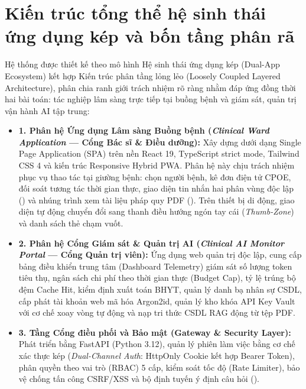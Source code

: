 \section{Kiến trúc tổng thể hệ sinh thái ứng dụng kép và bốn tầng phân rã}
\label{sec:system_architecture}

Hệ thống được thiết kế theo mô hình Hệ sinh thái ứng dụng kép (Dual-App Ecosystem) kết hợp Kiến trúc phân tầng lỏng lẻo (Loosely Coupled Layered Architecture), phân chia ranh giới trách nhiệm rõ ràng nhằm đáp ứng đồng thời hai bài toán: tác nghiệp lâm sàng trực tiếp tại buồng bệnh và giám sát, quản trị vận hành AI tập trung:

\begin{itemize}[leftmargin=1.5em]
    \item \textbf{1. Phân hệ Ứng dụng Lâm sàng Buồng bệnh (\textit{Clinical Ward Application} --- Cổng Bác sĩ \& Điều dưỡng):}
    Xây dựng dưới dạng Single Page Application (SPA) trên nền React 19, TypeScript strict mode, Tailwind CSS 4 và kiến trúc Responsive Hybrid PWA. Phân hệ này chịu trách nhiệm phục vụ thao tác tại giường bệnh: chọn người bệnh, kê đơn điện tử CPOE, đối soát tương tác thời gian thực, giao diện tin nhắn hai phân vùng độc lập () và nhúng trình xem tài liệu pháp quy PDF (). Trên thiết bị di động, giao diện tự động chuyển đổi sang thanh điều hướng ngón tay cái (\textit{Thumb-Zone}) và danh sách thẻ chạm vuốt.

    \item \textbf{2. Phân hệ Cổng Giám sát \& Quản trị AI (\textit{Clinical AI Monitor Portal} --- Cổng Quản trị viên):}
    Ứng dụng web quản trị độc lập, cung cấp bảng điều khiển trung tâm (Dashboard Telemetry) giám sát số lượng token tiêu thụ, ngân sách chi phí theo thời gian thực (Budget Cap), tỷ lệ trúng bộ đệm Cache Hit, kiểm định xuất toán BHYT, quản lý danh bạ nhân sự CSDL, cấp phát tài khoản web mã hóa Argon2id, quản lý kho khóa API Key Vault với cơ chế xoay vòng tự động và nạp tri thức CSDL RAG động từ tệp PDF.

    \item \textbf{3. Tầng Cổng điều phối và Bảo mật (Gateway \& Security Layer):}
    Phát triển bằng FastAPI (Python 3.12), quản lý phiên làm việc bằng cơ chế xác thực kép (\textit{Dual-Channel Auth}: HttpOnly Cookie  kết hợp Bearer Token), phân quyền theo vai trò (RBAC) 5 cấp, kiểm soát tốc độ (Rate Limiter), bảo vệ chống tấn công CSRF/XSS và bộ định tuyến ý định câu hỏi ().


\end{itemize}
